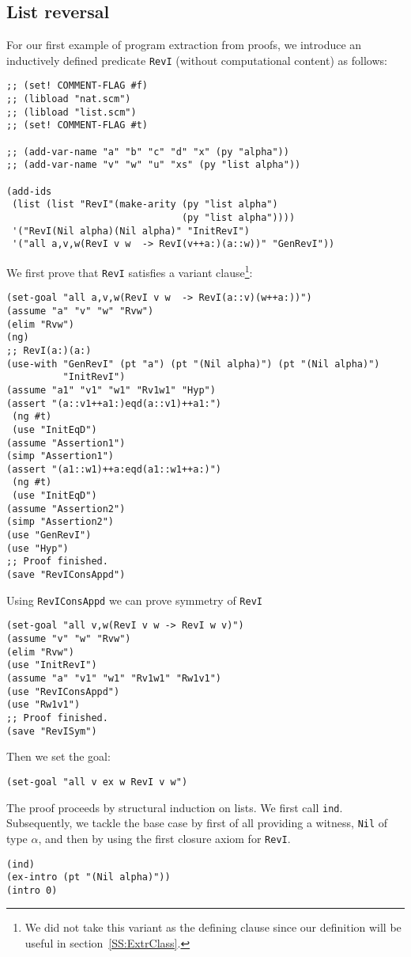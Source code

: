 \documentclass[12pt]{amsart}
\begin{document}
\subsection{List reversal}
\label{SS:ListReversal}
For our first example of program extraction from proofs, we introduce
an inductively defined predicate \texttt{RevI} (without computational
content) as follows:
\begin{verbatim}
;; (set! COMMENT-FLAG #f)
;; (libload "nat.scm")
;; (libload "list.scm")
;; (set! COMMENT-FLAG #t)

;; (add-var-name "a" "b" "c" "d" "x" (py "alpha"))
;; (add-var-name "v" "w" "u" "xs" (py "list alpha"))

(add-ids
 (list (list "RevI"(make-arity (py "list alpha")
                               (py "list alpha"))))
 '("RevI(Nil alpha)(Nil alpha)" "InitRevI")
 '("all a,v,w(RevI v w  -> RevI(v++a:)(a::w))" "GenRevI"))
\end{verbatim}
We first prove that \texttt{RevI} satisfies a variant
clause\footnote{We did not take this variant as the defining clause
  since our definition will be useful in section~\ref{SS:ExtrClass}.}:
\begin{verbatim}
(set-goal "all a,v,w(RevI v w  -> RevI(a::v)(w++a:))")
(assume "a" "v" "w" "Rvw")
(elim "Rvw")
(ng)
;; RevI(a:)(a:)
(use-with "GenRevI" (pt "a") (pt "(Nil alpha)") (pt "(Nil alpha)")
          "InitRevI")
(assume "a1" "v1" "w1" "Rv1w1" "Hyp")
(assert "(a::v1++a1:)eqd(a::v1)++a1:")
 (ng #t)
 (use "InitEqD")
(assume "Assertion1")
(simp "Assertion1")
(assert "(a1::w1)++a:eqd(a1::w1++a:)")
 (ng #t)
 (use "InitEqD")
(assume "Assertion2")
(simp "Assertion2")
(use "GenRevI")
(use "Hyp")
;; Proof finished.
(save "RevIConsAppd")
\end{verbatim}
Using \texttt{RevIConsAppd} we can prove symmetry of \texttt{RevI}
\begin{verbatim}
(set-goal "all v,w(RevI v w -> RevI w v)")
(assume "v" "w" "Rvw")
(elim "Rvw")
(use "InitRevI")
(assume "a" "v1" "w1" "Rv1w1" "Rw1v1")
(use "RevIConsAppd")
(use "Rw1v1")
;; Proof finished.
(save "RevISym")
\end{verbatim}
Then we set the goal:
\begin{verbatim}
(set-goal "all v ex w RevI v w")
\end{verbatim}
The proof proceeds by structural induction on lists.  We first call
\texttt{ind}.  Subsequently, we tackle the base case by first of all
providing a witness, \texttt{Nil} of type $\alpha$, and then by using
the first closure axiom for \texttt{RevI}.
\begin{verbatim}
(ind)
(ex-intro (pt "(Nil alpha)"))
(intro 0)
\end{verbatim}
\end{document}
